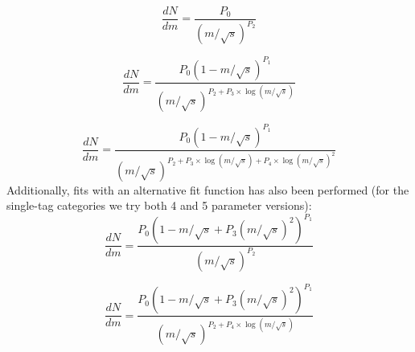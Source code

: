 \begin{equation}
\label{eq:dijet2}
\frac{dN}{dm}= \frac{ P_0 } { (m/\sqrt{s})^{P_2} }
\end{equation}

\begin{equation}
\label{eq:dijet4}
\frac{dN}{dm}= \frac{ P_0(1-m/\sqrt{s})^{P_1} } { (m/\sqrt{s})^{P_2+P_3\times\log(m/\sqrt{s})} }
\end{equation}

\begin{equation}
\label{eq:dijet5}
\frac{dN}{dm}= \frac{ P_0(1-m/\sqrt{s})^{P_1} } { (m/\sqrt{s})^{P_2+P_3\times\log(m/\sqrt{s})+P_4\times\log(m/\sqrt{s})^2} }
\end{equation}
Additionally, fits with an alternative fit function has also been performed (for the single-tag categories we try both 4 and 5 parameter versions):
\begin{equation}
\label{eq:dijet6}
\frac{dN}{dm}= \frac{ P_0(1-m/\sqrt{s}+P_3(m/\sqrt{s})^2)^{P_1} } { (m/\sqrt{s})^{P_2} }
\end{equation}

\begin{equation}
\label{eq:dijet7}
\frac{dN}{dm}= \frac{ P_0(1-m/\sqrt{s}+P_3(m/\sqrt{s})^2)^{P_1} } { (m/\sqrt{s})^{P_2+P_4\times\log(m/\sqrt{s})} }
\end{equation}

